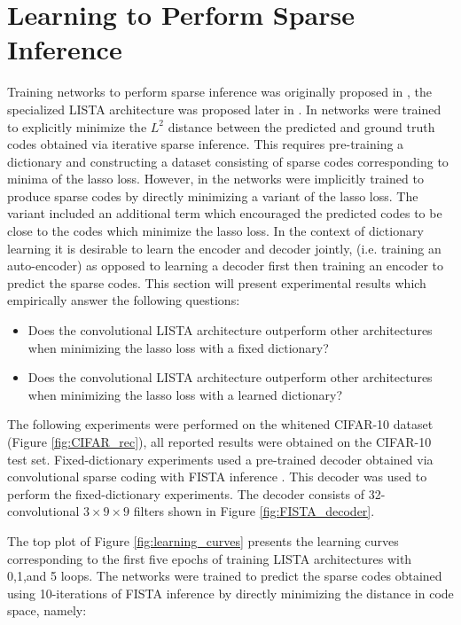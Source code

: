 \section{Learning to Perform Sparse Inference} Training networks to perform
sparse inference was originally proposed in \cite{groupSparsity}, the
specialized LISTA architecture was proposed later in \cite{LISTA}. In
\cite{LISTA} networks were trained to explicitly minimize the $L^2$ distance
between the predicted and ground truth codes obtained via iterative sparse
inference.  This requires pre-training a dictionary and constructing a dataset
consisting of sparse codes corresponding to minima of the lasso loss.  However,
in \cite{groupSparsity} the networks were implicitly trained to produce sparse
codes by directly minimizing a variant of the lasso loss. The variant included
an additional term which encouraged the predicted codes to be close to the
codes which minimize the lasso loss.  In the context of dictionary learning it
is desirable to learn the encoder and decoder jointly, (i.e. training an
auto-encoder) as opposed to learning a decoder first then training an encoder
to predict the sparse codes. This section will present experimental results
which empirically answer the following questions: \begin{itemize} \item{Does
the convolutional LISTA architecture outperform other architectures when
minimizing the lasso loss with a fixed dictionary?} \item{Does the
convolutional LISTA architecture outperform other architectures when minimizing
the lasso loss with a learned dictionary?} \end{itemize} The following
experiments were performed on the whitened CIFAR-10 dataset (Figure
\ref{fig:CIFAR_rec}), all reported results were obtained on the CIFAR-10 test
set. Fixed-dictionary experiments used a pre-trained decoder obtained via
convolutional sparse coding with FISTA inference \cite{ConvSC}.  This decoder
was used to perform the fixed-dictionary experiments. The decoder consists of
32-convolutional $3\times9\times9$ filters shown in Figure
\ref{fig:FISTA_decoder}. 

The top plot of Figure \ref{fig:learning_curves} presents the learning curves
corresponding to the first five epochs of training LISTA architectures with
0,1,and 5 loops. The networks were trained to predict the sparse codes obtained
using 10-iterations of FISTA inference by directly minimizing the distance in
code space, namely:

